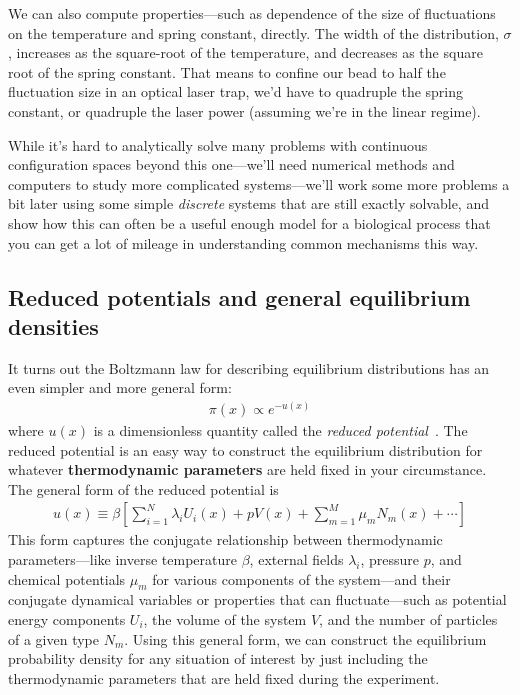 \documentclass[english,course]{lecture}
\begin{document}
We can also compute properties---such as dependence of the size of fluctuations on the temperature and spring constant, directly.
The width of the distribution, $\sigma$, increases as the square-root of the temperature, and decreases as the square root of the spring constant.
That means to confine our bead to half the fluctuation size in an optical laser trap, we'd have to quadruple the spring constant, or quadruple the laser power (assuming we're in the linear regime).

While it's hard to analytically solve many problems with continuous configuration spaces beyond this one---we'll need numerical methods and computers to study more complicated systems---we'll work some more problems a bit later using some simple \emph{discrete} systems that are still exactly solvable, and show how this can often be a useful enough model for a biological process that you can get a lot of mileage in understanding common mechanisms this way.

\subsection{Reduced potentials and general equilibrium densities}

It turns out the Boltzmann law for describing equilibrium distributions has an even simpler and more general form:
\begin{eqnarray}
\pi(x) \propto e^{-u(x)}
\end{eqnarray}
where $u(x)$ is a dimensionless quantity called the \emph{reduced potential}~\cite{shirts2008statistically}.
The reduced potential is an easy way to construct the equilibrium distribution for whatever {\bf thermodynamic parameters} are held fixed in your circumstance.
The general form of the reduced potential is
\begin{eqnarray}
u(x) \equiv \beta \left[ \sum_{i=1}^N \lambda_i U_i(x) + p V(x) + \sum_{m=1}^M \mu_m N_m(x) + \cdots \right]
\end{eqnarray}
This form captures the conjugate relationship between thermodynamic parameters---like inverse temperature $\beta$, external fields $\lambda_i$, pressure $p$, and chemical potentials $\mu_m$ for various components of the system---and their conjugate dynamical variables or properties that can fluctuate---such as potential energy components $U_i$, the volume of the system $V$, and the number of particles of a given type $N_m$.
Using this general form, we can construct the equilibrium probability density for any situation of interest by just including the thermodynamic parameters that are held fixed during the experiment.
\end{document}
